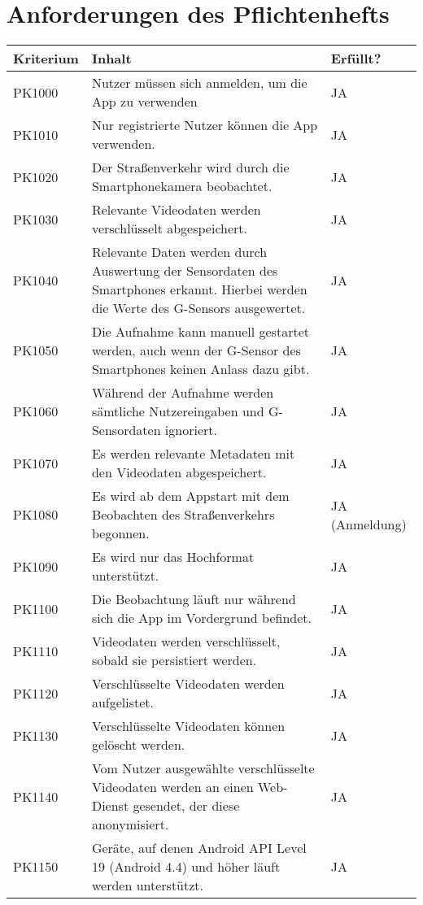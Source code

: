 \chapter{Anforderungen des Pflichtenhefts} \label{funcspec}
\begin{longtable}{p{} | p{} | p{}}
\hline
  \textbf{Kriterium} & \textbf{Inhalt} & \textbf{Erfüllt?} \\
  \hline
  PK1000 & Nutzer müssen sich anmelden, um die App zu verwenden & JA \\
  \hline
  PK1010 & Nur registrierte Nutzer können die App verwenden. & JA \\
  \hline 
  PK1020 & Der Straßenverkehr wird durch die Smartphonekamera beobachtet. & JA
  \\
  \hline 
  PK1030 & Relevante Videodaten werden verschlüsselt abgespeichert. & JA
  \\
  \hline 
  PK1040 & Relevante Daten werden durch Auswertung der Sensordaten des Smartphones erkannt. Hierbei werden die Werte des G-Sensors ausgewertet. & JA
  \\
  \hline 
  PK1050 & Die Aufnahme kann manuell gestartet werden, auch wenn der G-Sensor des Smartphones keinen Anlass dazu gibt. & JA
  \\
  \hline 
  PK1060 & Während der Aufnahme werden sämtliche Nutzereingaben und G-Sensordaten ignoriert. & JA
  \\
  \hline 
  PK1070 & Es werden relevante Metadaten mit den Videodaten abgespeichert. & JA
  \\
  \hline 
  PK1080 & Es wird ab dem Appstart mit dem Beobachten des Straßenverkehrs begonnen. & JA (Anmeldung)
  \\
  \hline 
  PK1090 & Es wird nur das Hochformat unterstützt. & JA
   \\
  \hline 
  PK1100 & Die Beobachtung läuft nur während sich die App im Vordergrund befindet. & JA
   \\
  \hline 
  PK1110 & Videodaten werden verschlüsselt, sobald sie persistiert werden. & JA
   \\
  \hline 
  PK1120 & Verschlüsselte Videodaten werden aufgelistet. & JA
   \\
  \hline 
  PK1130 & Verschlüsselte Videodaten können gelöscht werden. & JA
   \\
  \hline 
  PK1140 & Vom Nutzer ausgewählte verschlüsselte Videodaten werden an einen Web-Dienst gesendet, der diese anonymisiert. & JA
   \\
  \hline 
  PK1150 & Geräte, auf denen Android API Level 19 (Android 4.4) und höher läuft werden unterstützt. & JA

\end{longtable}
